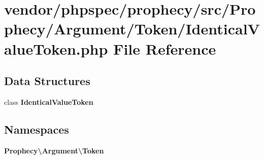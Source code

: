 \section{vendor/phpspec/prophecy/src/\+Prophecy/\+Argument/\+Token/\+Identical\+Value\+Token.php File Reference}
\label{_identical_value_token_8php}
\subsection*{Data Structures}
\begin{DoxyCompactItemize}
\item 
class {\bf Identical\+Value\+Token}
\end{DoxyCompactItemize}
\subsection*{Namespaces}
\begin{DoxyCompactItemize}
\item 
 {\bf Prophecy\textbackslash{}\+Argument\textbackslash{}\+Token}
\end{DoxyCompactItemize}
